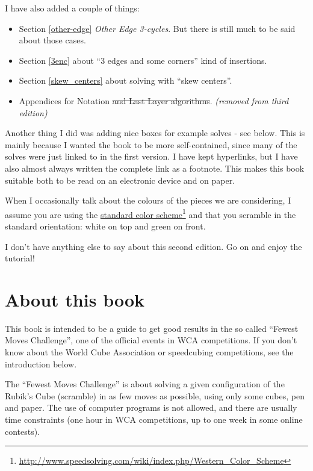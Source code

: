 \documentclass[11pt,a4paper]{book}
\begin{document}
I have also added a couple of things:

\begin{itemize}
\item Section \ref{other-edge} \emph{Other Edge 3-cycles}. But there is still much to be said about those cases.
\item Section \ref{3enc} about ``3 edges and some corners'' kind of insertions.
\item Section \ref{skew_centers} about solving with ``skew centers''.
\item Appendices for Notation \sout{and Last Layer algorithms}. \emph{(removed from third edition)}
\end{itemize}

Another thing I did was adding nice boxes for example solves - see below. This is mainly because I wanted the book to be more self-contained, since many of the solves were just linked to in the first version. I have kept hyperlinks, but I have also almost always written the complete link as a footnote. This makes this book suitable both to be read on an electronic device and on paper.

When I occasionally talk about the colours of the pieces we are considering, I assume you are using the \href{http://www.speedsolving.com/wiki/index.php/Western\_Color\_Scheme}{standard color scheme}\footnote{\url{http://www.speedsolving.com/wiki/index.php/Western\_Color\_Scheme}} and that you scramble in the standard orientation: white on top and green on front.

I don't have anything else to say about this second edition. Go on and enjoy the tutorial!

\newpage

\section*{About this book}

This book is intended to be a guide to get good results in the so called ``Fewest Moves Challenge'', one of the official events in WCA competitions. If you don't know about the World Cube Association or speedcubing competitions, see the introduction below.

The ``Fewest Moves Challenge'' is about solving a given configuration of the Rubik's Cube (scramble) in as few moves as possible, using only some cubes, pen and paper. The use of computer programs is not allowed, and there are usually time constraints (one hour in WCA competitions, up to one week in some online contests).
\end{document}
